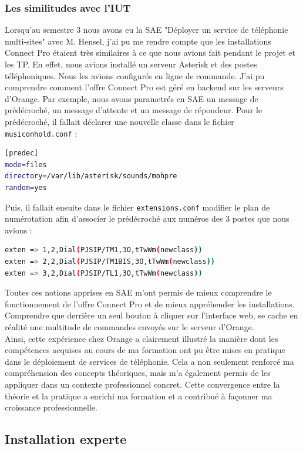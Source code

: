 \documentclass[12pt, a4paper]{article}
\begin{document}
\subsubsection{Les similitudes avec l'IUT}
Lorsqu'au semestre 3 nous avons eu la SAE "Déployer un service de 
téléphonie multi-sites" avec M. Hensel, j'ai pu me rendre compte
que les installations Connect Pro étaient très similaires à ce que
nous avions fait pendant le projet et les TP. En effet, nous avions installé un serveur
Asterisk et des postes téléphoniques. Nous les avions configurés 
en ligne de commande. J'ai pu comprendre comment l'offre Connect Pro 
est géré en backend sur les serveurs d'Orange. Par exemple, 
nous avons parametrés en SAE un message de prédécroché,
un message d'attente et un message de répondeur. 
Pour le prédécroché, il fallait déclarer une nouvelle 
classe dans le fichier \texttt{musiconhold.conf} : 

\begin{lstlisting}[language=bash, style=mystyle]
[predec]
mode=files
directory=/var/lib/asterisk/sounds/mohpre
random=yes
\end{lstlisting}
Puis, il fallait ensuite dans le fichier \texttt{extensions.conf}
modifier le plan de numérotation afin d'associer le prédécroché
aux numéros des 3 postes que nous avions : 
\begin{lstlisting}[language=bash, style=mystyle]
exten => 1,2,Dial(PJSIP/TM1,3O,tTwWm(newclass))
exten => 2,2,Dial(PJSIP/TM1BIS,3O,tTwWm(newclass))
exten => 3,2,Dial(PJSIP/TL1,3O,tTwWm(newclass))
\end{lstlisting}

Toutes ces notions apprises en SAE m'ont permis de mieux comprendre
le fonctionnement de l'offre Connect Pro et de mieux appréhender
les installations. Comprendre que derrière un seul bouton 
à cliquer sur l'interface web, se cache 
en réalité une multitude de commandes envoyés sur le serveur
d'Orange.\\

Ainsi, cette expérience chez Orange a clairement illustré la manière
dont les compétences acquises au cours de ma formation ont pu être
mises en pratique dans le déploiement de services de téléphonie.
Cela a non seulement renforcé ma compréhension des
concepts théoriques, mais m'a également permis de les appliquer
dans un contexte professionnel concret. Cette convergence entre
la théorie et la pratique a enrichi ma formation et a contribué
à façonner ma croissance professionnelle.

\newpage
\subsection{Installation experte}
\end{document}
